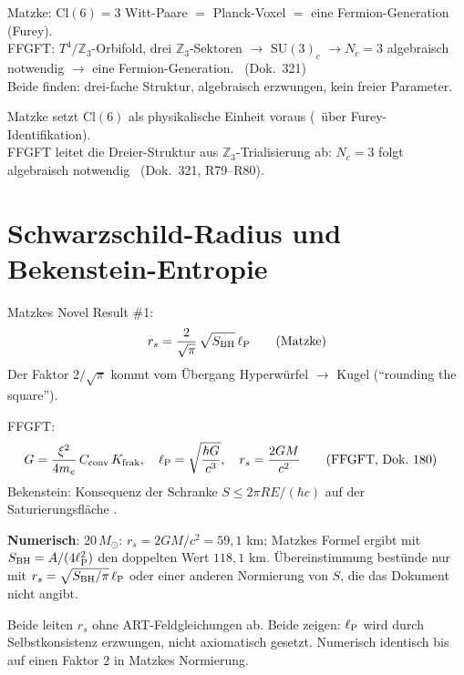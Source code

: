 \begin{tcolorbox}[convbox, title={Konvergenz: Fermion-Generation = algebraische Grundeinheit}]
  Matzke: $\mathrm{Cl}(6) = 3$ Witt-Paare $=$ Planck-Voxel $=$ eine Fermion-Generation (Furey). \B\\
  FFGFT: $T^4/\mathbb{Z}_3$-Orbifold, drei $\mathbb{Z}_3$-Sektoren $\to$ $\mathrm{SU}(3)_c$
  $\to N_c = 3$ algebraisch notwendig $\to$ eine Fermion-Generation. \B\ (Dok.\ 321)\\
  Beide finden: drei-fache Struktur, algebraisch erzwungen, kein freier Parameter.
\end{tcolorbox}

\begin{tcolorbox}[divbox, title={Divergenz: Tiefe der Ableitung}]
  Matzke setzt $\mathrm{Cl}(6)$ als physikalische Einheit voraus (\SETZ\ über Furey-Identifikation).\\
  FFGFT leitet die Dreier-Struktur aus $\mathbb{Z}_3$-Trialisierung ab:
  $N_c = 3$ folgt algebraisch notwendig \B\ (Dok.\ 321, R79–R80).
\end{tcolorbox}

\section{Schwarzschild-Radius und Bekenstein-Entropie}

Matzkes Novel Result \#1:
\begin{equation}
  r_s = \frac{2}{\sqrt{\pi}}\,\sqrt{S_{\mathrm{BH}}}\,\ell_{\mathrm{P}}
  \tag{Matzke}
\end{equation}
Der Faktor $2/\sqrt{\pi}$ kommt vom Übergang Hyperwürfel $\to$ Kugel
(\enquote{rounding the square}).

FFGFT:
\begin{align}
  G &= \frac{\xi^2}{4m_e}\,C_{\text{conv}}\,K_{\text{frak}},\quad \ell_{\mathrm{P}} = \sqrt{\frac{\hbar G}{c^3}},\quad
  r_s = \frac{2GM}{c^2}
  \tag{FFGFT, Dok.\ 180}
\end{align}
Bekenstein: Konsequenz der Schranke $S \leq 2\pi RE/(\hbar c)$ auf der Saturierungsfläche \B.

\textbf{Numerisch}: 20\,$M_\odot$: $r_s = 2GM/c^2 = 59{,}1$ km; Matzkes Formel ergibt mit $S_{\mathrm{BH}} = A/(4\ell_{\mathrm{P}}^2)$ den doppelten Wert $118{,}1$ km. Übereinstimmung bestünde nur mit $r_s = \sqrt{S_{\mathrm{BH}}/\pi}\,\ell_{\mathrm{P}}$ oder einer anderen Normierung von $S$, die das Dokument nicht angibt.

\begin{tcolorbox}[convbox, title={Konvergenz}]
  Beide leiten $r_s$ ohne ART-Feldgleichungen ab.
  Beide zeigen: $\ell_{\mathrm{P}}$ wird durch Selbstkonsistenz erzwungen, nicht axiomatisch gesetzt.
  Numerisch identisch bis auf einen Faktor 2 in Matzkes Normierung.
\end{tcolorbox}

